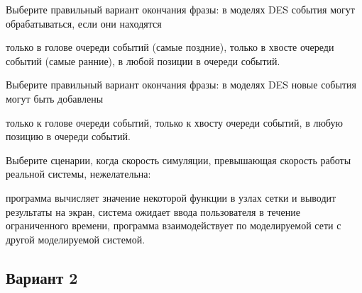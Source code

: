\begin{questions}
\question[3] Выберите правильный вариант окончания фразы: в моделях DES события могут обрабатываться, если они находятся
\begin{choices}
    \choice только в голове очереди событий (самые поздние),
    \correctchoice только в хвосте очереди событий (самые ранние),
    \choice в любой позиции в очереди событий.
\end{choices}

\question[3] Выберите правильный вариант окончания фразы: в моделях DES новые события могут быть добавлены
\begin{choices}
    \choice только к голове очереди событий,
    \choice только к хвосту очереди событий,
    \correctchoice в любую позицию в очереди событий.
\end{choices}
    
\question[3] Выберите сценарии, когда скорость симуляции, превышающая скорость работы реальной системы, нежелательна:
\begin{choices}
    \choice программа вычисляет значение некоторой функции в узлах сетки и выводит результаты на экран,
    \correctchoice система ожидает ввода пользователя в течение ограниченного времени,
    \choice программа взаимодействует по моделируемой сети с другой моделируемой системой.
\end{choices}


\end{questions}

\subsection*{Вариант 2}

